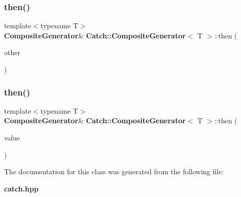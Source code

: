 \subsubsection{then()\hspace{0.1cm}{\footnotesize\ttfamily [1/2]}}
{\footnotesize\ttfamily template$<$typename T$>$ \\
\textbf{ Composite\+Generator}\& \textbf{ Catch\+::\+Composite\+Generator}$<$ T $>$\+::then (\begin{DoxyParamCaption}\item[{\textbf{ Composite\+Generator}$<$ T $>$ \&}]{other }\end{DoxyParamCaption})\hspace{0.3cm}{\ttfamily [inline]}}

\mbox{\label{class_catch_1_1_composite_generator_aefdc11bcfccdf07d2db5f0da3ed8758c}} 
\subsubsection{then()\hspace{0.1cm}{\footnotesize\ttfamily [2/2]}}
{\footnotesize\ttfamily template$<$typename T$>$ \\
\textbf{ Composite\+Generator}\& \textbf{ Catch\+::\+Composite\+Generator}$<$ T $>$\+::then (\begin{DoxyParamCaption}\item[{T}]{value }\end{DoxyParamCaption})\hspace{0.3cm}{\ttfamily [inline]}}



The documentation for this class was generated from the following file\+:\begin{DoxyCompactItemize}
\item 
\textbf{ catch.\+hpp}\end{DoxyCompactItemize}
